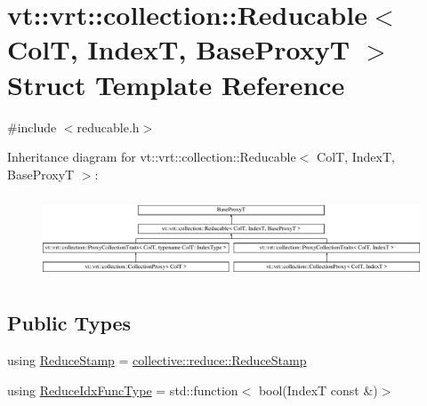 \hypertarget{structvt_1_1vrt_1_1collection_1_1_reducable}{}\section{vt\+:\+:vrt\+:\+:collection\+:\+:Reducable$<$ ColT, IndexT, Base\+ProxyT $>$ Struct Template Reference}
\label{structvt_1_1vrt_1_1collection_1_1_reducable}


{\ttfamily \#include $<$reducable.\+h$>$}

Inheritance diagram for vt\+:\+:vrt\+:\+:collection\+:\+:Reducable$<$ ColT, IndexT, Base\+ProxyT $>$\+:\begin{figure}[H]
\begin{center}
\leavevmode
\includegraphics[height=2.516854cm]{structvt_1_1vrt_1_1collection_1_1_reducable}
\end{center}
\end{figure}
\subsection*{Public Types}
\begin{DoxyCompactItemize}
\item 
using \hyperlink{structvt_1_1vrt_1_1collection_1_1_reducable_a19f80baf23f36dad4948ef07322fd0cb}{Reduce\+Stamp} = \hyperlink{namespacevt_1_1collective_1_1reduce_a7b7cb3021ac5654d92825d9fab0250b2}{collective\+::reduce\+::\+Reduce\+Stamp}
\item 
using \hyperlink{structvt_1_1vrt_1_1collection_1_1_reducable_a9f5a6c385efafe1fa52937f4809a9486}{Reduce\+Idx\+Func\+Type} = std\+::function$<$ bool(IndexT const  \&)$>$
\end{DoxyCompactItemize}
